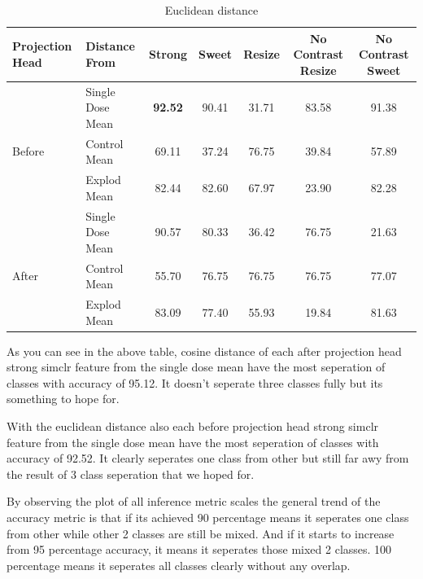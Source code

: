 \begin{table}[H]
  \centering
  \begin{tabular}{@{}llccccc@{}}
  \toprule
  Projection Head & Distance From      & Strong & Sweet & Resize & No Contrast Resize & No Contrast Sweet \\ \midrule
                  & Single Dose Mean   & \textbf{92.52}      & 90.41     & 31.71      & 83.58                  &  91.38                \\
  Before          & Control Mean       & 69.11      & 37.24     & 76.75      & 39.84                  & 57.89                 \\
                  & Explod Mean        & 82.44      & 82.60    & 67.97      & 23.90                  & 82.28                 \\ \midrule
                  & Single Dose Mean   & 90.57     & 80.33     & 36.42      & 76.75                  & 21.63                 \\
  After           & Control Mean       & 55.70      & 76.75     & 76.75      & 76.75                  & 77.07                 \\
                  & Explod Mean        & 83.09      & 77.40     & 55.93      & 19.84                  &  81.63                \\ \bottomrule
  \end{tabular}
  \caption{Euclidean distance}
  \label{tab:table_label}
\end{table}

As you can see in the above table, cosine distance of each after projection head strong simclr feature from the single dose mean have the most seperation of classes with accuracy of 95.12. It doesn't seperate three classes fully but its something to hope for. 

With the euclidean distance also  each before projection head strong simclr feature from the single dose mean have the most seperation of classes with accuracy of 92.52. It clearly  seperates one class from other but still far awy from the result of 3 class seperation that we hoped for.

By observing the plot of all inference metric scales the general trend of the accuracy metric is that if its achieved 90 percentage means it seperates one class from other while other 2 classes are still be mixed. And if it starts to increase  from   95 percentage accuracy, it means it seperates those mixed  2 classes. 100 percentage means it seperates all classes clearly without any overlap.

